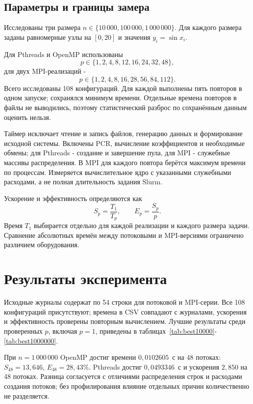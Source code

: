 \documentclass[14pt,a4paper]{extarticle}
\begin{document}
\subsection{Параметры и границы замера}
Исследованы три размера $n\in\{10\,000,100\,000,1\,000\,000\}$. Для каждого размера заданы равномерные узлы на $[0,20]$ и значения $y_i=\sin x_i$.

Для Pthreads и OpenMP использованы
\begin{equation}
p\in\{1,2,4,8,12,16,24,32,48\},
\end{equation}
для двух MPI-реализаций -
\begin{equation}
p\in\{1,2,4,8,16,28,56,84,112\}.
\end{equation}
Всего исследованы 108 конфигураций. Для каждой выполнены пять повторов в одном запуске; сохранялся минимум времени. Отдельные времена повторов в файлы не выводились, поэтому статистический разброс по сохранённым данным оценить нельзя.

Таймер исключает чтение и запись файлов, генерацию данных и формирование исходной системы. Включены PCR, вычисление коэффициентов и необходимые обмены; для Pthreads - создание и завершение пула, для MPI - служебные массивы распределения. В MPI для каждого повтора берётся максимум времени по процессам. Измеряется вычислительное ядро с указанными служебными расходами, а не полная длительность задания Slurm.

Ускорение и эффективность определяются как
\begin{equation}
S_p=\frac{T_1}{T_p},\qquad E_p=\frac{S_p}{p}.
\end{equation}
Время $T_1$ выбирается отдельно для каждой реализации и каждого размера задачи. Сравнение абсолютных времён между потоковыми и MPI-версиями ограничено различием оборудования.

\section{Результаты эксперимента}
Исходные журналы содержат по 54 строки для потоковой и MPI-серии. Все 108 конфигураций присутствуют; времена в CSV совпадают с журналами, ускорения и эффективность проверены повторным вычислением. Лучшие результаты среди проверенных $p$, включая $p=1$, приведены в таблицах~\ref{tab:best10000}-\ref{tab:best1000000}.



При $n=1\,000\,000$ OpenMP достиг времени $0{,}0102605$~с на 48 потоках: $S_{48}=13{,}646$, $E_{48}=28{,}43\%$. Pthreads достиг $0{,}0493346$~с и ускорения $2{,}850$ на 48 потоках. Разница согласуется с отличиями распределения строк и расходами создания потоков; без профилирования влияние отдельных причин количественно не разделяется.
\end{document}
